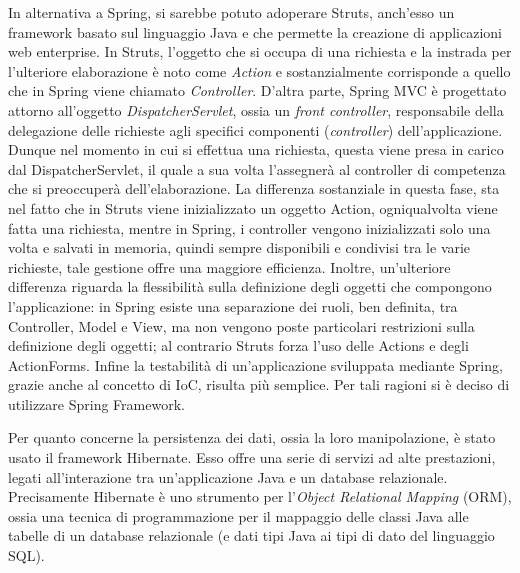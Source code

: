In alternativa a Spring, si sarebbe potuto adoperare Struts, anch'esso un framework basato sul linguaggio Java e che permette la creazione di applicazioni web enterprise. In Struts, l'oggetto che si occupa di una richiesta e la instrada per l'ulteriore elaborazione è noto come \textit{Action} e sostanzialmente corrisponde a quello che in Spring viene chiamato \textit{Controller}. D'altra parte, Spring MVC è progettato attorno all'oggetto \textit{DispatcherServlet}, ossia un \textit{front controller}, responsabile della delegazione delle richieste agli specifici componenti (\textit{controller}) dell'applicazione. Dunque nel momento in cui si effettua una richiesta, questa viene presa in carico dal DispatcherServlet, il quale a sua volta l'assegnerà al controller di competenza che si preoccuperà dell'elaborazione. La differenza sostanziale in questa fase, sta nel fatto che in Struts viene inizializzato un oggetto Action, ogniqualvolta viene fatta una richiesta, mentre in Spring, i controller vengono inizializzati solo una volta e salvati in memoria, quindi sempre disponibili e condivisi tra le varie richieste, tale gestione offre una maggiore efficienza. Inoltre, un'ulteriore differenza riguarda la flessibilità sulla definizione degli oggetti che compongono l'applicazione: in Spring esiste una separazione dei ruoli, ben definita, tra Controller, Model e View, ma non vengono poste particolari restrizioni sulla definizione degli oggetti; al contrario Struts forza l'uso delle Actions e degli ActionForms. Infine la testabilità di un'applicazione sviluppata mediante Spring, grazie anche al concetto di IoC, risulta più semplice. Per tali ragioni si è deciso di utilizzare Spring Framework.

Per quanto concerne la persistenza dei dati, ossia la loro manipolazione, è stato usato il framework Hibernate. Esso offre una serie di servizi ad alte prestazioni, legati all'interazione tra un'applicazione Java e un database relazionale. Precisamente Hibernate è uno strumento per l'\textit{Object Relational Mapping} (ORM), ossia una tecnica di programmazione per il mappaggio delle classi Java alle tabelle di un database relazionale (e dati tipi Java ai tipi di dato del linguaggio SQL). 

